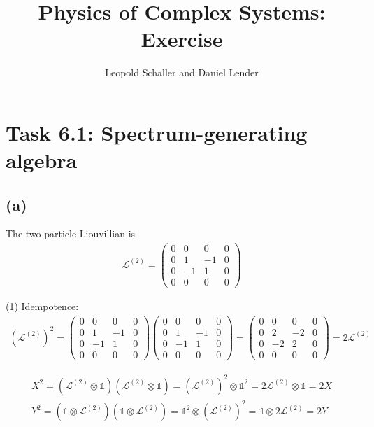 \documentclass{article}
\title{Physics of Complex Systems: Exercise }
\author{Leopold Schaller and Daniel Lender}
\begin{document}
\maketitle

\section*{Task 6.1: Spectrum-generating algebra}
\subsection*{(a)}
The two particle Liouvillian is
\begin{align}
    \mathcal{L}^{(2)}=
    \begin{pmatrix}
        0&0&0&0\\
        0&1&-1&0\\
        0&-1&1&0\\
        0&0&0&0
    \end{pmatrix}
\end{align}

(1) Idempotence:
\begin{align}
    \left(\mathcal{L}^{(2)}\right)^2=
    \begin{pmatrix}
        0&0&0&0\\
        0&1&-1&0\\
        0&-1&1&0\\
        0&0&0&0
    \end{pmatrix}
    \begin{pmatrix}
        0&0&0&0\\
        0&1&-1&0\\
        0&-1&1&0\\
        0&0&0&0
    \end{pmatrix}
    =
    \begin{pmatrix}
        0&0&0&0\\
        0&2&-2&0\\
        0&-2&2&0\\
        0&0&0&0
    \end{pmatrix}
    =2\mathcal{L}^{(2)}
\end{align}

\begin{align}
    X^2=(\mathcal{L}^{(2)}\otimes\mathbb{1})(\mathcal{L}^{(2)}\otimes\mathbb{1})=\left(\mathcal{L}^{(2)}\right)^2\otimes\mathbb{1}^2= 2\mathcal{L}^{(2)}\otimes\mathbb{1}= 2X\\
     Y^2=(\mathbb{1}\otimes\mathcal{L}^{(2)})(\mathbb{1}\otimes\mathcal{L}^{(2)})
     =\mathbb{1}^2\otimes\left(\mathcal{L}^{(2)}\right)^2= \mathbb{1}\otimes 2\mathcal{L}^{(2)}= 2Y
\end{align}
\end{document}
